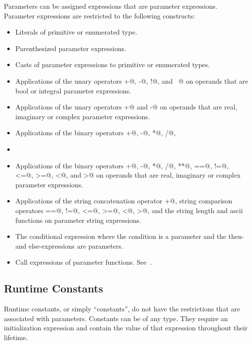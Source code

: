 Parameters can be assigned expressions that are parameter expressions.
Parameter expressions are restricted to the following constructs:
\begin{itemize}
\item
 Literals of primitive or enumerated type.
\item
 Parenthesized parameter expressions.
\item
 Casts of parameter expressions to primitive or enumerated types.
\item
 Applications of the unary operators \verb@+@, \verb@-@, \verb@!@,
 and \verb@~@ on operands that are bool or integral parameter
 expressions.
\item
 Applications of the unary operators \verb@+@ and \verb@-@ on operands that are
 real, imaginary or complex parameter
 expressions.
\item
 Applications of the binary operators \verb@+@, \verb@-@, \verb@*@, \verb@/@, \verb@%@, \verb@**@, \verb@&&@, \verb@||@, \verb@&@, \verb@|@, \verb@^@, \verb@<<@, \verb@>>@, \verb@==@, \verb@!=@, \verb@<=@, \verb@>=@, \verb@<@, and \verb@>@ on operands that are bool or integral parameter expressions.
\item
\item
 Applications of the binary
 operators \verb@+@, \verb@-@, \verb@*@, \verb@/@, \verb@**@, \verb@==@, \verb@!=@, \verb@<=@, \verb@>=@, \verb@<@,
 and \verb@>@ on operands that are real, imaginary or complex parameter expressions.
\item
 Applications of the string concatenation operator \verb@+@, string comparison operators \verb@==@, \verb@!=@, \verb@<=@, \verb@>=@, \verb@<@, \verb@>@, and the string length and ascii functions on parameter string expressions.
\item
 The conditional expression where the condition is a parameter and the
 then- and else-expressions are parameters.
\item
 Call expressions of parameter functions.  See~.
\end{itemize}

\subsection{Runtime Constants}
\label{Runtime_Constants}

Runtime constants, or simply ``constants'',
do not have the restrictions that are associated with
parameters.  Constants can be of any type.  They require an initialization
expression and contain the value of that expression throughout their lifetime.

